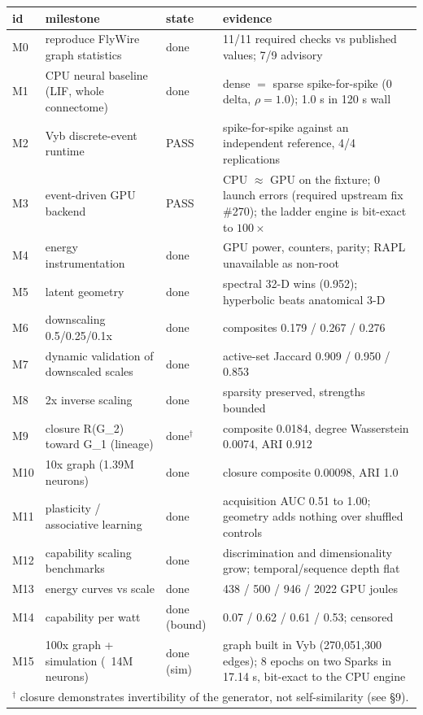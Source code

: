 {\small\setlength{\tabcolsep}{3pt}
\begin{tabular}{l p{5.0cm} l p{6.0cm}}
\toprule
id & milestone & state & evidence \\
\midrule
M0 & reproduce FlyWire graph statistics & done & 11/11 required checks vs published values; 7/9 advisory \\
M1 & CPU neural baseline (LIF, whole connectome) & done & dense $=$ sparse spike-for-spike (0 delta, $\rho=1.0$); 1.0 s in 120 s wall \\
M2 & Vyb discrete-event runtime & PASS & spike-for-spike against an independent reference, 4/4 replications \\
M3 & event-driven GPU backend & PASS & CPU $\approx$ GPU on the fixture; 0 launch errors (required upstream fix \#270); the ladder engine is bit-exact to $100\times$ \\
M4 & energy instrumentation & done & GPU power, counters, parity; RAPL unavailable as non-root \\
M5 & latent geometry & done & spectral 32-D wins (0.952); hyperbolic beats anatomical 3-D \\
M6 & downscaling 0.5/0.25/0.1x & done & composites 0.179 / 0.267 / 0.276 \\
M7 & dynamic validation of downscaled scales & done & active-set Jaccard 0.909 / 0.950 / 0.853 \\
M8 & 2x inverse scaling & done & sparsity preserved, strengths bounded \\
M9 & closure R(G\_2) toward G\_1 (lineage) & done$^{\dagger}$ & composite 0.0184, degree Wasserstein 0.0074, ARI 0.912 \\
M10 & 10x graph (1.39M neurons) & done & closure composite 0.00098, ARI 1.0 \\
M11 & plasticity / associative learning & done & acquisition AUC 0.51 to 1.00; geometry adds nothing over shuffled controls \\
M12 & capability scaling benchmarks & done & discrimination and dimensionality grow; temporal/sequence depth flat \\
M13 & energy curves vs scale & done & 438 / 500 / 946 / 2022 GPU joules \\
M14 & capability per watt & done (bound) & 0.07 / 0.62 / 0.61 / 0.53; censored \\
M15 & 100x graph + simulation (~14M neurons) & done (sim) & graph built in Vyb (270,051,300 edges); 8 epochs on two Sparks in 17.14 s, bit-exact to the CPU engine \\
\midrule
\multicolumn{4}{l}{\footnotesize $^{\dagger}$ closure demonstrates invertibility of the generator, not self-similarity (see \S 9).} \\
\bottomrule
\end{tabular}

}
